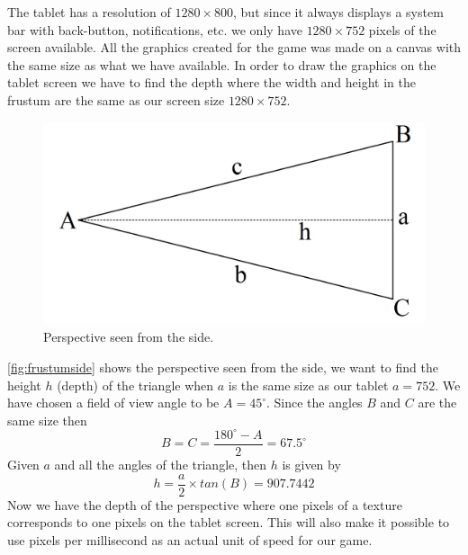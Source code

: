 The tablet has a resolution of $1280 \times 800$, but since it always displays a system bar with back-button, notifications, etc. we only have $1280 \times 752$ pixels of the screen available. All the graphics created for the game was made on a canvas with the same size as what we have available. In order to draw the graphics on the tablet screen we have to find the depth where the width and height in the frustum are the same as our screen size $1280 \times 752$.
\begin{figure}[H]
\centering
\includegraphics[width=0.5\linewidth]{img/trekant.png}
\caption{Perspective seen from the side.}
\label{fig:frustumside}
\end{figure}
\autoref{fig:frustumside} shows the perspective seen from the side, we want to find the height $h$ (depth) of the triangle when $a$ is the same size as our tablet $a = 752$. We have chosen a field of view angle to be $A = 45^{\circ}$. Since the angles $B$ and $C$ are the same size then
$$B = C = \frac{180^{\circ} - A}{2} = 67.5^{\circ}$$
Given $a$ and all the angles of the triangle, then $h$ is given by
$$h = \frac{a}{2} \times tan(B) = 907.7442$$
Now we have the depth of the perspective where one pixels of a texture corresponds to one pixels on the tablet screen. This will also make it possible to use pixels per millisecond as an actual unit of speed for our game.